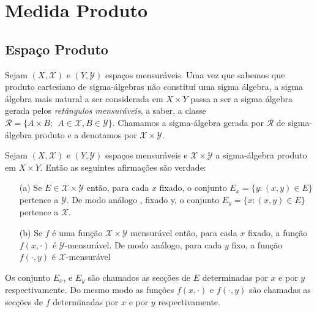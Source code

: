 \chapter[Aula 10]{Medida Produto}
\chaptermark{}

\section{Espaço Produto}

Sejam $(X, \mathscr{X})$ e $(Y, \mathscr{Y})$ espaços mensuráveis. 
Uma vez que sabemos que produto cartesiano de sigma-álgebras não 
constitui uma sigma álgebra, a sigma álgebra mais natural a ser 
considerada em $X\times Y$ passa a ser a sigma álgebra gerada pelos
\emph{retângulos mensuráveis}, a saber, a classe $\mathscr{R}=\{
A\times B;~~A\in \mathscr{X}, B\in \mathscr{Y}\}.$ Chamamos a 
sigma-álgebra gerada por $\mathscr{R}$ de sigma-álgebra produto e 
a denotamos por $\mathscr{X}\times \mathscr{Y}$.



\begin{proposicao}
Sejam $(X, \mathscr{X})$ e $(Y, \mathscr{Y})$ espaços mensuráveis e 
$\mathscr{X}\times \mathscr{Y}$ a sigma-álgebra produto em $X\times Y$.
Então as seguintes afirmações são verdade:
\begin{itemize}
\item[(a)] Se $E\in \mathscr{X}\times \mathscr{Y}$ então, para cada $x$ fixado,
 o conjunto $E_x=\{y: (x,y)\in E\}$ pertence a $\mathscr{Y}$. De modo análogo 
, fixado y,  o conjunto $E_y=\{x: (x,y)\in E\}$ pertence a $\mathscr{X}$.



\item[(b)] Se $f$ é uma função $\mathscr{X}\times \mathscr{Y}$ mensurável 
então, para cada $x$ fixado, a função $f(x, \cdot)$ é $\mathscr{Y}$-mensurável. De 
modo análogo, para cada $y$ fixo, a função $f(\cdot, y)$ é $\mathscr{X}$-mensurável
\end{itemize}
\end{proposicao}


Os conjunto $E_x$, e $E_y$ são chamados as secções de $E$ determinadas por $x$ e 
por $y$ respectivamente. Do mesmo modo as funções $f(x, \cdot)$ e $f(\cdot, y)$ 
são chamadas as secções de $f$ determinadas por $x$ e por $y$ respectivamente.
\medskip

